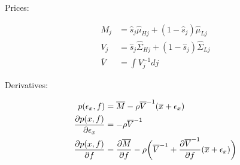 \documentclass{article}
\begin{document}
Prices:

\begin{align*}
    M_j &= \hat s_j \hat \mu_{Hj} + (1 - \hat s_j) \hat \mu_{Lj} \\
    V_j &= \hat s_j \hat \Sigma_{Hj} + (1 - \hat s_j) \hat \Sigma_{Lj} \\
    \overline V &= \int V_j^{-1} dj 
\end{align*}

Derivatives: 

\begin{align*}
    p(\epsilon_x,f) &= \overline M - \rho \overline V^{-1} (\overline x + \epsilon_x) \\
    \partialderivative{p(x,f)}{\epsilon_x} &= -\rho \overline V^{-1} \\
    \partialderivative{p(x,f)}{f} &= \partialderivative{\overline M}{f} 
        - \rho \bigg(
            \overline V^{-1} + 
            \frac{\partial \overline V^{-1}}{\partial f} (\overline x + \epsilon_x)\bigg)
\end{align*}
\end{document}
